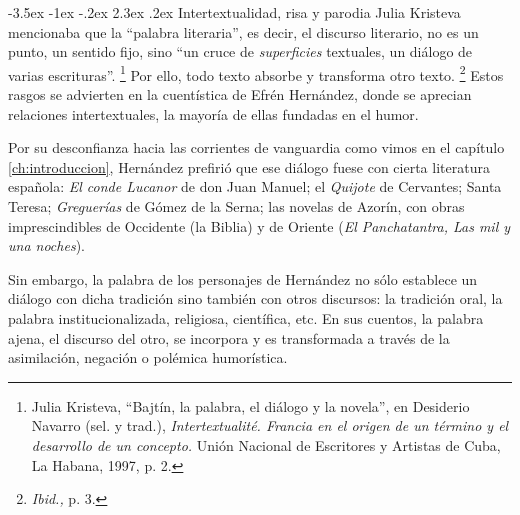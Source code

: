 \documentclass[14pt,twoside,final]{extbook} %
\makeatletter
\let\oldfootnote\footnote
\renewcommand\footnote[1]{%
\oldfootnote{\hspace{1mm}#1}}
\renewcommand\section{\@startsection {section}{1}{\z@}%
                                     {-3.5ex \@plus -1ex \@minus -.2ex}%
                                     {2.3ex \@plus .2ex}%
                                     {\normalfont\large\bfseries\sc}}
\makeatother
\begin{document}
\section{Intertextualidad, risa y parodia}\label{sec:intertextualidad-risa-parodia}
Julia Kristeva mencionaba que la ``palabra literaria'', es decir, el discurso literario, no es un punto, un sentido fijo, sino ``un cruce de \emph{superficies} textuales, un diálogo de varias escrituras''.\footnote{Julia Kristeva, ``Bajtín, la palabra, el diálogo y la novela'', en Desiderio Navarro (sel. y trad.), \emph{Intertextualité. Francia en el origen de un término y el desarrollo de un concepto.} Unión Nacional de Escritores y Artistas de Cuba, La Habana, 1997, p. 2.} Por ello, todo texto absorbe y transforma otro texto.\footnote{\emph{Ibid.,} p. 3.} Estos rasgos se advierten en la cuentística de Efrén Hernández, donde se aprecian relaciones intertextuales, la mayoría de ellas fundadas en el humor.

Por su desconfianza hacia las corrientes de vanguardia como vimos en el capítulo \ref{ch:introduccion}, Hernández prefirió que ese diálogo fuese con cierta literatura española: \emph{El conde Lucanor} de don Juan Manuel; el \emph{Quijote} de Cervantes; Santa Teresa; \emph{Greguerías} de Gómez de la Serna; las novelas de Azorín, con obras imprescindibles de Occidente (la Biblia) y de Oriente (\textit{El Panchatantra, Las mil y una noches}).\protect\enlargethispage*{\baselineskip}

Sin embargo, la palabra de los personajes de Hernández no sólo establece un diálogo con dicha tradición sino también con otros discursos: la tradición oral, la palabra institucionalizada, religiosa, científica, etc. En sus cuentos, la palabra ajena, el discurso del otro, se incorpora y es transformada a través de la asimilación, negación o polémica humorística.
\end{document}
